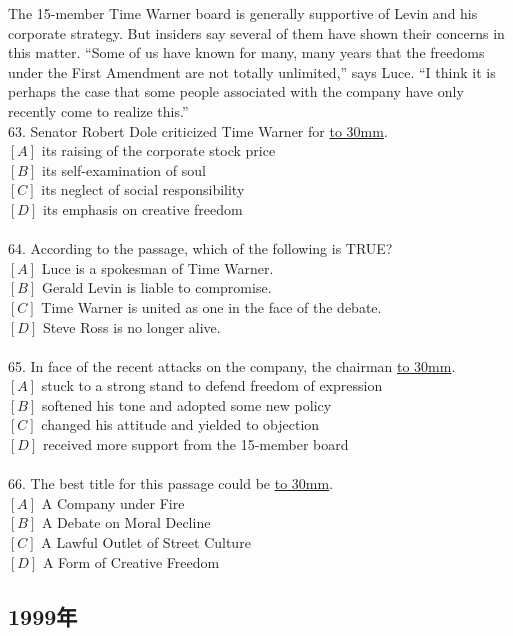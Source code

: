 \documentclass[a4paper]{article}
\begin{document}
\par
The 15-member Time Warner board is generally supportive of Levin and his corporate strategy. But insiders say several of them have shown their concerns in this matter. “Some of us have known for many, many years that the freedoms under the First Amendment are not totally unlimited,” says Luce. “I think it is perhaps the case that some people associated with the company have only recently come to realize this.”
\\63.	Senator Robert Dole criticized Time Warner for \underline{\hbox to 30mm{}}.\\$[A]$ its raising of the corporate stock price\\$[B]$ its self-examination of soul\\$[C]$ its neglect of social responsibility\\$[D]$ its emphasis on creative freedom\\\\64.	According to the passage, which of the following is TRUE?\\$[A]$ Luce is a spokesman of Time Warner.\\$[B]$ Gerald Levin is liable to compromise.\\$[C]$ Time Warner is united as one in the face of the debate.\\$[D]$ Steve Ross is no longer alive.\\\\65.	In face of the recent attacks on the company, the chairman \underline{\hbox to 30mm{}}.\\$[A]$ stuck to a strong stand to defend freedom of expression\\$[B]$ softened his tone and adopted some new policy\\$[C]$ changed his attitude and yielded to objection\\$[D]$ received more support from the 15-member board\\\\66.	The best title for this passage could be \underline{\hbox to 30mm{}}.\\$[A]$ A Company under Fire\\$[B]$ A Debate on Moral Decline\\$[C]$ A Lawful Outlet of Street Culture\\$[D]$ A Form of Creative Freedom\\\subsection{1999年}
\end{document}
